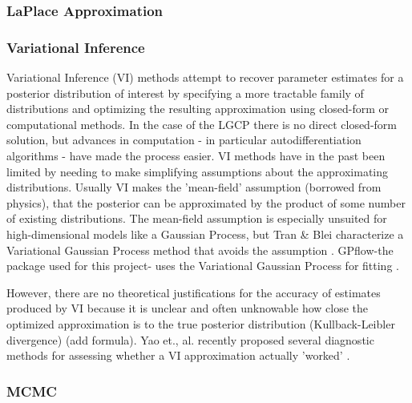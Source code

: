 \subsubsection{LaPlace Approximation}


\subsubsection{Variational Inference}

Variational Inference (VI) methods attempt to recover parameter estimates for a posterior distribution of interest by specifying a more tractable family of distributions and optimizing the resulting approximation using closed-form or computational methods. In the case of the LGCP there is no direct closed-form solution, but advances in computation - in particular autodifferentiation algorithms - have made the process easier. VI methods have in the past been limited by needing to make simplifying assumptions about the approximating distributions. Usually VI makes the 'mean-field' assumption (borrowed from physics), that the posterior can be approximated by the product of some number of existing distributions. The mean-field assumption is especially unsuited for high-dimensional models like a Gaussian Process, but Tran & Blei characterize a Variational Gaussian Process method that avoids the assumption \cite{tran_2015}. GPflow-the package used for this project- uses the Variational Gaussian Process for fitting \cite{GPflow2017}.\par

However, there are no theoretical justifications for the accuracy of estimates produced by VI because it is unclear and often unknowable how close the optimized approximation is to the true posterior distribution (Kullback-Leibler divergence) \todo(add formula). Yao et., al. recently proposed several diagnostic methods for assessing whether a VI approximation actually 'worked' \cite{yao_2018}.

\subsubsection{MCMC}

